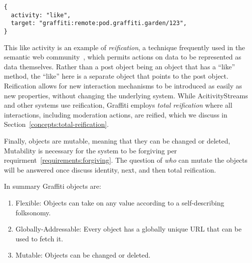 \begin{verbatim}
{
  activity: "like",
  target: "graffiti:remote:pod.graffiti.garden/123",
}
\end{verbatim}

This like activity is an example of \emph{reification},
a technique frequently used in the semantic web community~\cite{rdfprimer},
which permits actions on data to be represented as data themselves.
Rather than a post object being an object that has a ``like'' method,
the ``like'' here is a separate object that points to the post object.
Reification allows for new interaction mechanisms to be introduced as easily as new properties,
without changing the underlying system.
While AcitivityStreams and other systems use reification,
Graffiti employs \emph{total reification} where
all interactions, including moderation actions, are reified,
which we discuss in
Section~\ref{concepts:total-reification}.

Finally, objects are mutable, meaning that they can be changed or deleted,
Mutability is necessary for the system to be forgiving per requirment~\ref{requirements:forgiving}.
The question of \emph{who} can mutate the objects
will be answered once discuss identity, next, and then total reification.

In summary Graffiti objects are:

\begin{enumerate}
\item
Flexible: Objects can take on any value according to a self-describing folksonomy.
\item
Globally-Addressable: Every object has a globally unique URL that can be used to fetch it.
\item
Mutable: Objects can be changed or deleted.
\end{enumerate}


